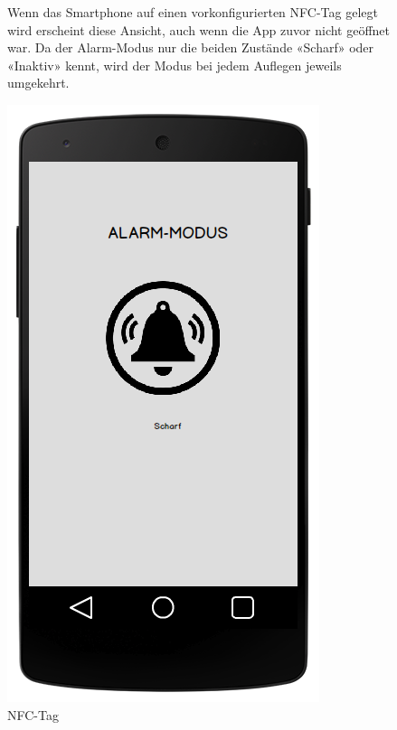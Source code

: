 \begin{figure}[H]
	\begin{minipage}{0.6\textwidth} 
Wenn das Smartphone auf einen vorkonfigurierten NFC-Tag gelegt wird erscheint diese Ansicht, auch wenn die App zuvor nicht geöffnet war. Da der Alarm-Modus nur die beiden Zustände «Scharf» oder «Inaktiv» kennt, wird der Modus bei jedem Auflegen jeweils umgekehrt.
	\end{minipage}
	\hfill
	\begin{minipage}{0.32\textwidth}
		\includegraphics[width=\textwidth]{report/img/mockup_nfc.png}
		\caption{NFC-Tag}
		\label{fig:mockupNfc}
	\end{minipage}
\end{figure}



